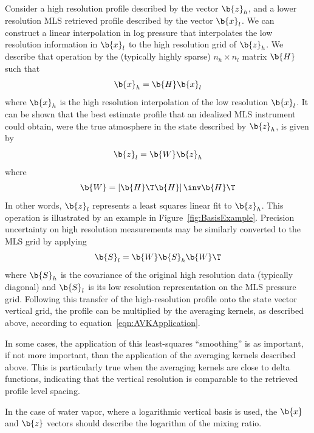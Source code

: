 \documentclass[11pt,draft]{report}
\begin{document}
Consider a high resolution profile described by the vector $\b{z}_h$,
and a lower resolution MLS retrieved profile described by the vector
$\b{x}_l$.  We can construct a linear interpolation in log pressure that
interpolates the low resolution information in $\b{x}_l$ to the high
resolution grid of $\b{z}_h$.  We describe that operation by the
(typically highly sparse) $n_h \times n_l$ matrix $\b{H}$ such that
\begin{equation}
\b{x}_h = \b{H}\b{x}_l
\label{eqn:EtaForward}
\end{equation}
where $\b{x}_h$ is the high resolution interpolation of the low
resolution $\b{x}_l$.  It can be shown that the best estimate profile
that an idealized MLS instrument could obtain, were the true atmosphere
in the state described by $\b{z}_h$, is given by
\begin{equation}
\b{z}_l = \b{W}\b{z}_h
\label{eqn:EtaBackward}
\end{equation}
where
\begin{equation}
\b{W} = \left[ \b{H}\T \b{H} \right]\inv \b{H}\T
\end{equation}
In other words, $\b{z}_l$ represents a least squares linear fit to
$\b{z}_h$. This operation is illustrated by an example in
Figure~\ref{fig:BasisExample}.  Precision uncertainty on high resolution
measurements may be similarly converted to the MLS grid by applying
\begin{equation}
\b{S}_l = \b{W} \b{S}_h \b{W}\T
\end{equation}
where $\b{S}_h$ is the covariance of the original high resolution data
(typically diagonal) and $\b{S}_l$ is its low resolution representation
on the MLS pressure grid.  Following this transfer of the
high-resolution profile onto the state vector vertical grid, the profile
can be multiplied by the averaging kernels, as described above,
according to equation~\ref{eqn:AVKApplication}.

In some cases, the application of this least-squares ``smoothing'' is as
important, if not more important, than the application of the averaging
kernels described above.  This is particularly true when the averaging
kernels are close to delta functions, indicating that the vertical
resolution is comparable to the retrieved profile level spacing.

In the case of water vapor, where a logarithmic vertical basis is used,
the $\b{x}$ and $\b{z}$ vectors should describe the logarithm of the
mixing ratio.
\end{document}
